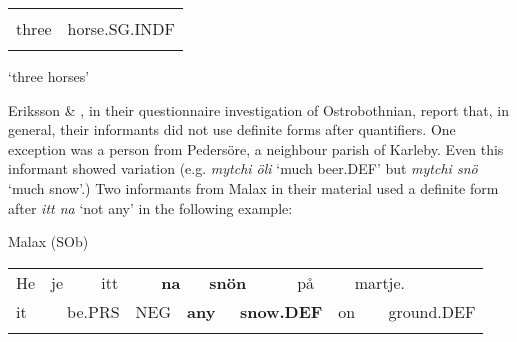 \begin{tabular}{ll}
\lsptoprule
\multicolumn{2}{l}{tri

}\\
three & horse.SG.INDF\\
\lspbottomrule
\end{tabular}

\begin{styleTranslation}
‘three horses’

\end{styleTranslation}

\begin{styleBodyTextFirst}
Eriksson \& \citet[26]{Rendahl1999}, in their questionnaire investigation of Ostrobothnian, report that, in general, their informants did not use definite forms after quantifiers. One exception was a person from Pedersöre, a neighbour parish of Karleby. Even this informant showed variation (e.g. \textit{mytchi öli} ‘much beer.DEF’ but \textit{mytchi snö} ‘much snow’.) Two informants from Malax in their material used a definite form after \textit{itt na} ‘not any’ in the following example:

\end{styleBodyTextFirst}

\begin{listWWNumileveli}
\item 

\begin{styleExample}
Malax (SOb)

\end{styleExample}

\end{listWWNumileveli}

\begin{tabular}{llllllllllllll}
\lsptoprule
He & \multicolumn{2}{l}{je

} & \multicolumn{2}{l}{itt

} & \multicolumn{2}{l}{{\bfseries na}

} & \multicolumn{2}{l}{{\bfseries snön}

} & \multicolumn{2}{l}{på

} & \multicolumn{2}{l}{martje.

} & \\
\multicolumn{2}{l}{it

} & \multicolumn{2}{l}{be.PRS

} & \multicolumn{2}{l}{NEG

} & \multicolumn{2}{l}{{\bfseries any}

} & \multicolumn{2}{l}{{\bfseries snow.DEF}

} & \multicolumn{2}{l}{on

} & \multicolumn{2}{l}{ground.DEF

}\\
\lspbottomrule
\end{tabular}

